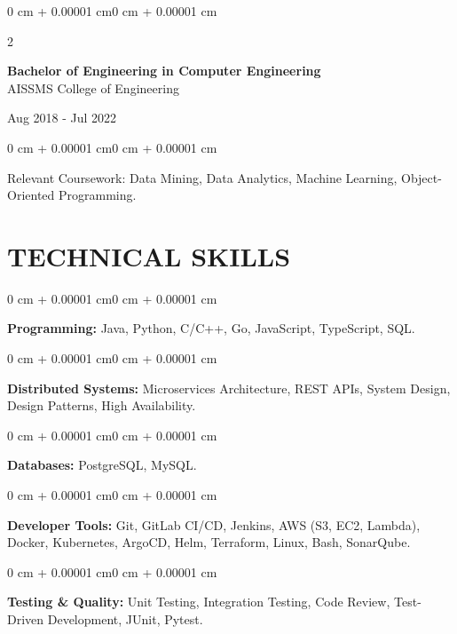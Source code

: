 \documentclass[10pt, letterpaper]{article}
\newenvironment{onecolentry}{
    \begin{adjustwidth}{0 cm + 0.00001 cm}{0 cm + 0.00001 cm}
}{
    \end{adjustwidth}
}
\newenvironment{twocolentry}[2][]{
    \onecolentry
    \def\secondColumn{#2}
    \setcolumnwidth{\fill, 4.5 cm}
    \begin{paracol}{2}
}{
    \switchcolumn \raggedleft \secondColumn
    \end{paracol}
    \endonecolentry
}
\begin{document}
\begin{twocolentry}{
    Aug 2018 - Jul 2022
}
    \textbf{Bachelor of Engineering in Computer Engineering} \\
    AISSMS College of Engineering
\end{twocolentry}
\begin{onecolentry}
Relevant Coursework: Data Mining, Data Analytics, Machine Learning, Object-Oriented Programming.
\end{onecolentry}
\section{TECHNICAL SKILLS}
\begin{onecolentry}
\textbf{Programming:} Java, Python, C/C++, Go, JavaScript, TypeScript, SQL.
\end{onecolentry}
\vspace{0.06 cm}
\begin{onecolentry}
\textbf{Distributed Systems:} Microservices Architecture, REST APIs, System Design, Design Patterns, High Availability.
\end{onecolentry}
\vspace{0.06 cm}
\begin{onecolentry}
\textbf{Databases:} PostgreSQL, MySQL.
\end{onecolentry}
\vspace{0.06 cm}
\begin{onecolentry}
\textbf{Developer Tools:} Git, GitLab CI/CD, Jenkins, AWS (S3, EC2, Lambda), Docker, Kubernetes, ArgoCD, Helm, Terraform, Linux, Bash, SonarQube.
\end{onecolentry}
\vspace{0.06 cm}
\begin{onecolentry}
\textbf{Testing \& Quality:} Unit Testing, Integration Testing, Code Review, Test-Driven Development, JUnit, Pytest.
\end{onecolentry}

\end{document}
